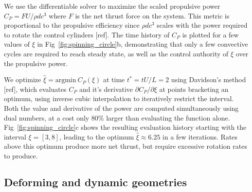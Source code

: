\documentclass[final,3p,times]{elsarticle}
\begin{document}
We use the differentiable solver to maximize the scaled propulsive power $C_P = FU/\rho dc^3$ where $F$ is the net thrust force on the system. This metric is  proportional to the propulsive efficiency since $\rho dc^3$ scales with the power required to rotate the control cylinders [ref]. The time history of $C_P$ is plotted for a few values of $\xi$ in Fig~\ref{fig:spinning_circle}b, demonstrating that only a few convective cycles are required to reach steady state, as well as the control authority of $\xi$ over the propulsive power.

We optimize $\hat\xi=\text{argmin}\ C_P(\xi)$ at time $t^*=tU/L=2$ using Davidson's method [ref], which evaluates $C_P$ and it's derivative $\partial C_P/\partial \xi$ at points bracketing an optimum, using inverse cubic interpolation to iteratively restrict the interval. Both the value and derivative of the power are computed simultaneously using dual numbers, at a cost only 80\% larger than evaluating the function alone. Fig~\ref{fig:spinning_circle}c shows the resulting evaluation history starting with the interval $\xi=[3,8]$, leading to the optimum $\hat\xi\approx 6.25$ in a few iterations. Rates above this optimum produce more net thrust, but require excessive rotation rates to produce.

\subsection{Deforming and dynamic geometries}
\end{document}
